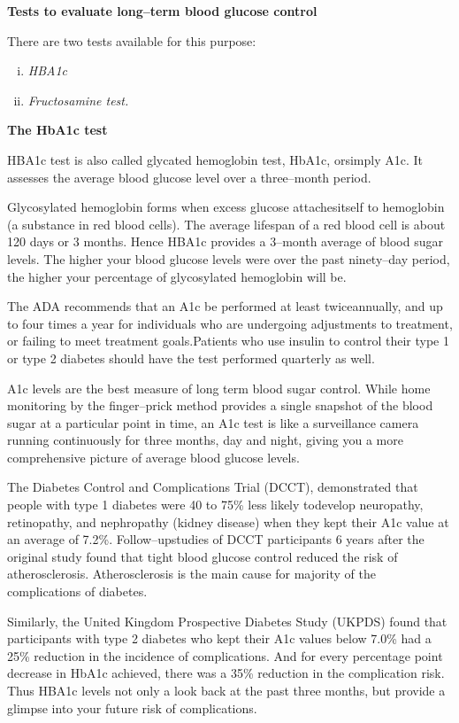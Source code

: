 \noindent\textbf{Tests to evaluate long–term blood glucose control}

\noindent There are two tests available for this purpose:
\begin{enumerate}[i.]
\itemsep=0pt
\item \textit{HBA1c}
\item \textit{Fructosamine test.}
\end{enumerate}

\noindent\textbf{The HbA1c test}

HBA1c test is also called glycated hemoglobin test, HbA1c, or\break simply A1c. It assesses the average blood glucose level over a three–month period.

Glycosylated hemoglobin forms when excess glucose attaches\break itself to hemoglobin (a substance in red blood cells). The average life\-span of a red blood cell is about 120 days or 3 months. Hence HBA1c provides a 3–month average of blood sugar levels. The higher your blood glucose levels were over the past ninety–day period, the higher your percentage of glycosylated hemoglobin will be.

The ADA recommends that an A1c be performed at least twice\break annually, and up to four times a year for individuals who are under\-going adjustments to treatment, or failing to meet treatment goals.\break Patients who use insulin to control their type 1 or type 2 diabetes should have the test performed quarterly as well.

A1c levels are the best measure of long term blood sugar control. While home monitoring by the finger–prick method provides a single snapshot of the blood sugar at a particular point in time, an A1c test is like a surveillance camera running continuously for three months, day and night, giving you a more comprehensive picture of average blood glucose levels.

The Diabetes Control and Complications Trial (DCCT), demonstra\-ted that people with type 1 diabetes were 40 to 75\% less likely to\break develop neuropathy, retinopathy, and nephropathy (kidney di\-sease) when they kept their A1c value at an average of 7.2\%. Follow–up\break studies of DCCT participants 6 years after the original study found that tight blood glucose control reduced the risk of atherosclerosis. Athero\-sclerosis is the main cause for majority of the complications of diabetes.

Similarly, the United Kingdom Prospective Diabetes Study (UKPDS) found that participants with type 2 diabetes who kept their A1c values below 7.0\% had a 25\% reduction in the incidence of complications. And for every percentage point decrease in HbA1c achieved, there was a 35\% reduction in the complication risk. Thus HBA1c levels not only a look back at the past three months, but provide a glimpse into your future risk of complications.

